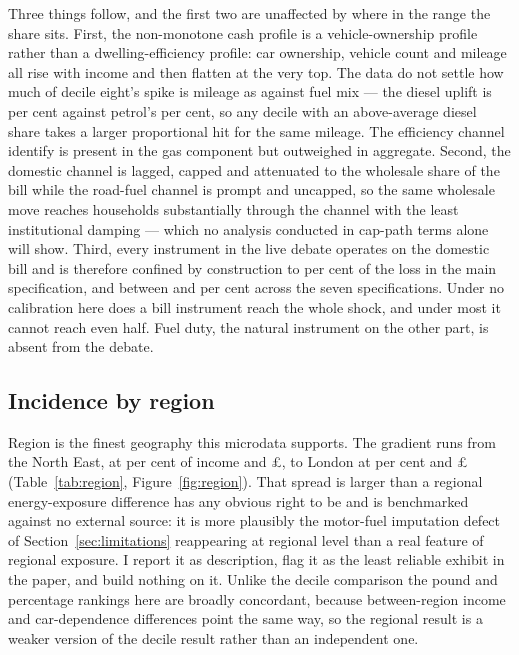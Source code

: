 Three things follow, and the first two are unaffected by where in the range the share sits. First, the non-monotone cash profile is a vehicle-ownership profile rather than a dwelling-efficiency profile: car ownership, vehicle count and mileage all rise with income and then flatten at the very top. The data do not settle how much of decile eight's spike is mileage as against fuel mix --- the diesel uplift is \genDieselUpliftPct{} per cent against petrol's \genPetrolUpliftPct{} per cent, so any decile with an above-average diesel share takes a larger proportional hit for the same mileage. The efficiency channel \citet{fetzer2024} identify is present in the gas component but outweighed in aggregate. Second, the domestic channel is lagged, capped and attenuated to the wholesale share of the bill while the road-fuel channel is prompt and uncapped, so the same wholesale move reaches households substantially through the channel with the least institutional damping --- which no analysis conducted in cap-path terms alone will show. Third, every instrument in the live debate operates on the domestic bill and is therefore confined by construction to \genDomesticShareOfLoss{} per cent of the loss in the main specification, and between \genPeakFuelDomesticShareOfLoss{} and \genSteadyStateDomesticShareOfLoss{} per cent across the seven specifications. Under no calibration here does a bill instrument reach the whole shock, and under most it cannot reach even half. Fuel duty, the natural instrument on the other part, is absent from the debate.

\subsection{Incidence by region}
\label{sec:results-region}

Region is the finest geography this microdata supports. The gradient runs from the North East, at \genRegionMaxLossPct{} per cent of income and \pounds \genRegionMaxLossGbp{}, to London at \genRegionMinLossPct{} per cent and \pounds \genRegionMinLossGbp{} (Table~\ref{tab:region}, Figure~\ref{fig:region}). That spread is larger than a regional energy-exposure difference has any obvious right to be and is benchmarked against no external source: it is more plausibly the motor-fuel imputation defect of Section~\ref{sec:limitations} reappearing at regional level than a real feature of regional exposure. I report it as description, flag it as the least reliable exhibit in the paper, and build nothing on it. Unlike the decile comparison the pound and percentage rankings here are broadly concordant, because between-region income and car-dependence differences point the same way, so the regional result is a weaker version of the decile result rather than an independent one.


